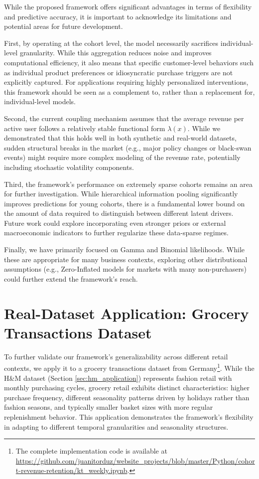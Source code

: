 \documentclass[11pt]{amsart}
\theoremstyle{definition}
\begin{document}
While the proposed framework offers significant advantages in terms of flexibility and predictive accuracy, it is 
important to acknowledge its limitations and potential areas for future development.

First, by operating at the cohort level, the model necessarily sacrifices individual-level granularity. While this 
aggregation reduces noise and improves computational efficiency, it also means that specific customer-level behaviors 
such as individual product preferences or idiosyncratic purchase triggers are not explicitly captured. For applications 
requiring highly personalized interventions, this framework should be seen as a complement to, rather than a 
replacement for, individual-level models.

Second, the current coupling mechanism assumes that the average revenue per active user follows a relatively stable 
functional form $\lambda(x)$. While we demonstrated that this holds well in both synthetic and real-world datasets, 
sudden structural breaks in the market (e.g., major policy changes or black-swan events) might require more complex 
modeling of the revenue rate, potentially including stochastic volatility components.

Third, the framework's performance on extremely sparse cohorts remains an area for further investigation. While 
hierarchical information pooling significantly improves predictions for young cohorts, there is a fundamental lower 
bound on the amount of data required to distinguish between different latent drivers. Future work could explore 
incorporating even stronger priors or external macroeconomic indicators to further regularize these data-sparse regimes.

Finally, we have primarily focused on Gamma and Binomial likelihoods. While these are appropriate for many business 
contexts, exploring other distributional assumptions (e.g., Zero-Inflated models for markets with many non-purchasers) 
could further extend the framework's reach.

\section{Real-Dataset Application: Grocery Transactions Dataset}\label{sec:kt_application}

To further validate our framework's generalizability across different retail contexts, we apply it to a grocery
transactions dataset from Germany\footnote{The complete implementation code is available at 
\url{https://github.com/juanitorduz/website_projects/blob/master/Python/cohort-revenue-retention/kt_weekly.ipynb}.}.
While the H\&M dataset (Section \ref{sec:hm_application}) represents fashion retail with monthly purchasing cycles,
grocery retail exhibits distinct characteristics: higher purchase frequency, different seasonality patterns driven
by holidays rather than fashion seasons, and typically smaller basket sizes with more regular replenishment behavior.
This application demonstrates the framework's flexibility in adapting to different temporal granularities and
seasonality structures.
\end{document}
